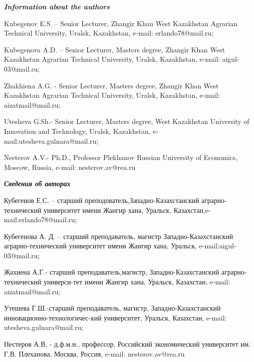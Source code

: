 \emph{{\bfseries Information about the authors}}
\begin{noparindent}

Kubegenov E.S. -- Senior Lecturer, Zhangir Khan West Kazakhstan Agrarian
Technical University, Uralsk, Kazakhstan, e-mail: erlando78@mail.ru;

Kubegenova A.D. -- Senior Lecturer, Master\textquotesingle s degree,
Zhangir Khan West Kazakhstan Agrarian Technical University, Uralsk,
Kazakhstan, e-mail: aigul-03@mail.ru;

Zhakhiena A.G. - Senior Lecturer, Master\textquotesingle s degree,
Zhangir Khan West Kazakhstan Agrarian Technical University, Uralsk,
Kazakhstan, e-mail: aizatmail@mail.ru;

Utesheva G.Sh.- Senior Lecturer, Master\textquotesingle s degree, West
Kazakhstan University of Innovation and Technology, Uralsk, Kazakhstan,
e-mail:utesheva.gulnara@mail.ru;

Nesterov A.V.- Ph.D., Professor Plekhanov Russian University of
Economics, Moscow, Russia, e-mail: nesterov.av@rea.ru
\end{noparindent}

\emph{{\bfseries Сведения об авторах}}
\begin{noparindent}

Кубегенов Е.С. -- старший преподователь,Западно-Казахстанский
аграрно-технический университет имени Жангир хана, Уральск,
Казахстан,e-mail:erlando78@mail.ru;

Кубегенова А. Д. -- старший преподаватель, магистр Западно-Казахстанский
аграрно-технический университет имени Жангир хана, Уральск,
e-mail:aigul-03@mail.ru;

Жахиена А.Г.- старший преподаватель,магистр, Западно-Казахстанский
аграрно-технический универси-тет имени Жангир хана, Уральск, Казахстан,
e-mail: aizatmail@mail.ru;

Утешева Г.Ш.-старший преподаватель, магистр, Западно-Казахстанский
инновационно-технологичес-кий университет, Уральск, Казахстан, e-mail:
utesheva.gulnara@mail.ru;

Нестеров А.В. - д.ф.м.н., профессор, Российский экономический
университет им. Г.В. Плеханова, Москва, Россия, e-mail:
nesterov.av@rea.ru

\end{noparindent}
